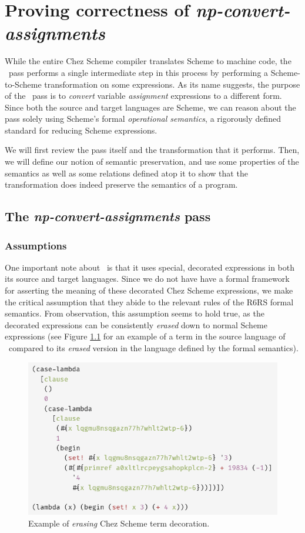 \chapter{Proving correctness of \textit{np-convert-assignments}}\label{chap:proof}
While the entire Chez Scheme compiler translates Scheme to machine code, the \caname\ pass performs a single intermediate step in this process by performing a Scheme-to-Scheme transformation on some expressions. As its name suggests, the purpose of the \caname\ pass is to \textit{convert} variable \textit{assignment} expressions to a different form. Since both the source and target languages are Scheme, we can reason about the pass solely using Scheme's formal \textit{operational semantics}, a rigorously defined standard for reducing Scheme expressions.

We will first review the pass itself and the transformation that it performs. Then, we will define our notion of semantic preservation, and use some properties of the semantics as well as some relations defined atop it to show that the transformation does indeed preserve the semantics of a program.
\section{The \textit{np-convert-assignments} pass\label{sxn:ca-pass}}
\subsection{Assumptions}
One important note about \caname\ is that it uses special, decorated expressions in both its source and target languages. Since we do not have have a formal framework for asserting the meaning of these decorated Chez Scheme expressions, we make the critical assumption that they abide to the relevant rules of the R6RS formal semantics. From observation, this assumption seems to hold true, as the decorated expressions can be consistently \textit{erased} down to normal Scheme expressions (see Figure \ref{fig:chez_erase} for an example of a term in the source language of \caname\ compared to its \textit{erased} version in the language defined by the formal semantics).

\begin{figure}[h]
    \centering
    \includegraphics[scale=0.75, keepaspectratio]{figures/chez_erase.png}
    \caption{Example of \textit{erasing} Chez Scheme term decoration.}
    \label{fig:chez_erase}
\end{figure}

